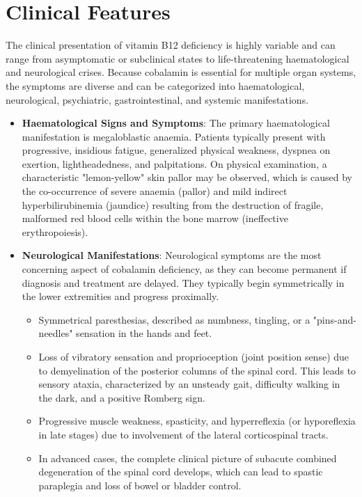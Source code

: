 \section*{Clinical Features}
The clinical presentation of vitamin B12 deficiency is highly variable and can range from asymptomatic or subclinical states to life-threatening haematological and neurological crises. Because cobalamin is essential for multiple organ systems, the symptoms are diverse and can be categorized into haematological, neurological, psychiatric, gastrointestinal, and systemic manifestations.

\begin{itemize}
    \item \textbf{Haematological Signs and Symptoms}: The primary haematological manifestation is megaloblastic anaemia. Patients typically present with progressive, insidious fatigue, generalized physical weakness, dyspnea on exertion, lightheadedness, and palpitations. On physical examination, a characteristic "lemon-yellow" skin pallor may be observed, which is caused by the co-occurrence of severe anaemia (pallor) and mild indirect hyperbilirubinemia (jaundice) resulting from the destruction of fragile, malformed red blood cells within the bone marrow (ineffective erythropoiesis).
    \item \textbf{Neurological Manifestations}: Neurological symptoms are the most concerning aspect of cobalamin deficiency, as they can become permanent if diagnosis and treatment are delayed. They typically begin symmetrically in the lower extremities and progress proximally.
    \begin{itemize}
        \item Symmetrical paresthesias, described as numbness, tingling, or a "pins-and-needles" sensation in the hands and feet.
        \item Loss of vibratory sensation and proprioception (joint position sense) due to demyelination of the posterior columns of the spinal cord. This leads to sensory ataxia, characterized by an unsteady gait, difficulty walking in the dark, and a positive Romberg sign.
        \item Progressive muscle weakness, spasticity, and hyperreflexia (or hyporeflexia in late stages) due to involvement of the lateral corticospinal tracts.
        \item In advanced cases, the complete clinical picture of subacute combined degeneration of the spinal cord develops, which can lead to spastic paraplegia and loss of bowel or bladder control.

\end{itemize}
\end{itemize}
